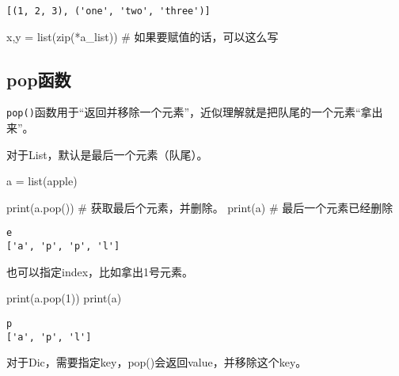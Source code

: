 \documentclass[
  letterpaper,
  DIV=11,
  numbers=noendperiod]{scrreprt}
\newenvironment{Shaded}{\begin{snugshade}}{\end{snugshade}}
\newcommand{\BuiltInTok}[1]{\textcolor[rgb]{0.00,0.23,0.31}{#1}}
\newcommand{\CommentTok}[1]{\textcolor[rgb]{0.37,0.37,0.37}{#1}}
\newcommand{\DecValTok}[1]{\textcolor[rgb]{0.68,0.00,0.00}{#1}}
\newcommand{\NormalTok}[1]{\textcolor[rgb]{0.00,0.23,0.31}{#1}}
\newcommand{\OperatorTok}[1]{\textcolor[rgb]{0.37,0.37,0.37}{#1}}
\newcommand{\StringTok}[1]{\textcolor[rgb]{0.13,0.47,0.30}{#1}}
\begin{document}
\begin{verbatim}
[(1, 2, 3), ('one', 'two', 'three')]
\end{verbatim}

\begin{Shaded}
\begin{Highlighting}[]
\NormalTok{x,y }\OperatorTok{=} \BuiltInTok{list}\NormalTok{(}\BuiltInTok{zip}\NormalTok{(}\OperatorTok{*}\NormalTok{a\_list)) }\CommentTok{\# 如果要赋值的话，可以这么写}
\end{Highlighting}
\end{Shaded}

\hypertarget{popux51fdux6570}{%
\subsection{pop函数}\label{popux51fdux6570}}

\texttt{pop()}函数用于``返回并移除一个元素''，近似理解就是把队尾的一个元素``拿出来''。

对于List，默认是最后一个元素（队尾）。

\begin{Shaded}
\begin{Highlighting}[]
\NormalTok{a }\OperatorTok{=} \BuiltInTok{list}\NormalTok{(}\StringTok{\textquotesingle{}apple\textquotesingle{}}\NormalTok{)}

\BuiltInTok{print}\NormalTok{(a.pop()) }\CommentTok{\# 获取最后个元素，并删除。}
\BuiltInTok{print}\NormalTok{(a) }\CommentTok{\# 最后一个元素已经删除}
\end{Highlighting}
\end{Shaded}

\begin{verbatim}
e
['a', 'p', 'p', 'l']
\end{verbatim}

也可以指定index，比如拿出1号元素。

\begin{Shaded}
\begin{Highlighting}[]
\BuiltInTok{print}\NormalTok{(a.pop(}\DecValTok{1}\NormalTok{))}
\BuiltInTok{print}\NormalTok{(a)}
\end{Highlighting}
\end{Shaded}

\begin{verbatim}
p
['a', 'p', 'l']
\end{verbatim}

对于Dic，需要指定key，pop()会返回value，并移除这个key。
\end{document}
